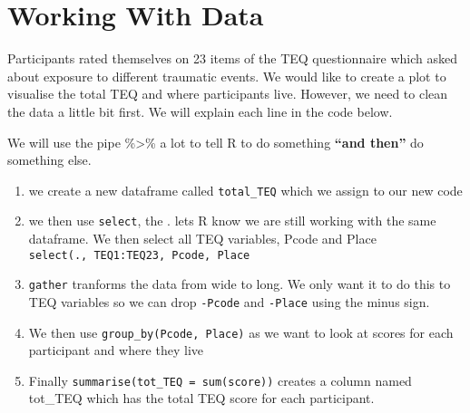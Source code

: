 \documentclass[]{book}
\newenvironment{Shaded}{\begin{snugshade}}{\end{snugshade}}
\newcommand{\DataTypeTok}[1]{\textcolor[rgb]{0.13,0.29,0.53}{#1}}
\newcommand{\KeywordTok}[1]{\textcolor[rgb]{0.13,0.29,0.53}{\textbf{#1}}}
\newcommand{\NormalTok}[1]{#1}
\newcommand{\OperatorTok}[1]{\textcolor[rgb]{0.81,0.36,0.00}{\textbf{#1}}}
\newcommand{\StringTok}[1]{\textcolor[rgb]{0.31,0.60,0.02}{#1}}
\providecommand{\tightlist}{%
  \setlength{\itemsep}{0pt}\setlength{\parskip}{0pt}}
\begin{document}
\hypertarget{working-with-data}{%
\section{Working With Data}\label{working-with-data}}

Participants rated themselves on 23 items of the TEQ questionnaire which asked about exposure to different traumatic events. We would like to create a plot to visualise the total TEQ and where participants live. However, we need to clean the data a little bit first. We will explain each line in the code below.

We will use the pipe \%\textgreater{}\% a lot to tell R to do something \textbf{``and then''} do something else.

\begin{enumerate}
\def\labelenumi{\arabic{enumi}.}
\tightlist
\item
  we create a new dataframe called \texttt{total\_TEQ} which we assign to our new code
\item
  we then use \texttt{select}, the . lets R know we are still working with the same dataframe. We then select all TEQ variables, Pcode and Place \texttt{select(.,\ TEQ1:TEQ23,\ Pcode,\ Place}
\item
  \texttt{gather} tranforms the data from wide to long. We only want it to do this to TEQ variables so we can drop \texttt{-Pcode} and \texttt{-Place} using the minus sign.
\item
  We then use \texttt{group\_by(Pcode,\ Place)} as we want to look at scores for each participant and where they live
\item
  Finally \texttt{summarise(tot\_TEQ\ =\ sum(score))} creates a column named tot\_TEQ which has the total TEQ score for each participant.
\end{enumerate}

\begin{Shaded}
\end{Shaded}
\end{document}
